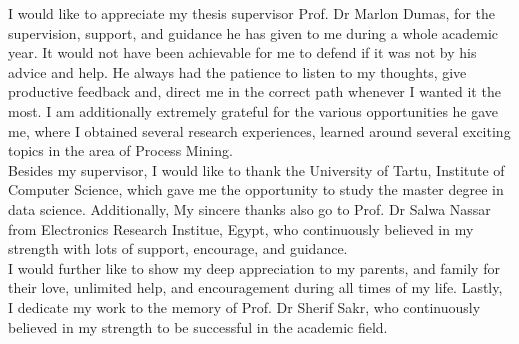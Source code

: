 

\begin{acknowledgements}      %



I would like to appreciate my thesis supervisor Prof. Dr Marlon Dumas, for the supervision, support, and guidance he has given to me during a whole academic year. It would not have been achievable for me to defend if it was not by his advice and help. He always had the patience to listen to my thoughts, give productive feedback and, direct me in the correct path whenever I wanted it the most. I am additionally extremely grateful for the various opportunities he gave me, where I obtained several research experiences, learned around several exciting topics in the area of Process Mining. \\


Besides my supervisor, I would like to thank the University of Tartu, Institute of Computer Science, which gave me the opportunity to study the master degree in data science. Additionally, My sincere thanks also go to Prof. Dr Salwa Nassar from Electronics Research Institue, Egypt, who continuously believed in my strength with lots of support, encourage, and guidance.  
\\

I would further like to show my deep appreciation to my parents, and family for their love, unlimited help, and encouragement during all times of my life. Lastly, I dedicate my work to the memory of Prof. Dr Sherif Sakr, who continuously believed in my strength to be successful in the academic field.



\end{acknowledgements}



